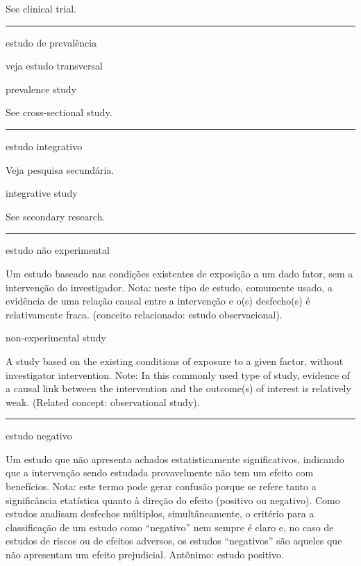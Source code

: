 \documentclass[
]{book}
\begin{document}
See clinical trial.

\begin{center}\rule{0.5\linewidth}{0.5pt}\end{center}

estudo de prevalência

veja estudo transversal

prevalence study

See cross-sectional study.

\begin{center}\rule{0.5\linewidth}{0.5pt}\end{center}

estudo integrativo

Veja pesquisa secundária.

integrative study

See secondary research.

\begin{center}\rule{0.5\linewidth}{0.5pt}\end{center}

estudo não experimental

Um estudo baseado nas condições existentes de exposição a um dado fator, sem a intervenção do investigador. Nota: neste tipo de estudo, comumente usado, a evidência de uma relação causal entre a intervenção e o(s) desfecho(s) é relativamente fraca. (conceito relacionado: estudo observacional).

non-experimental study

A study based on the existing conditions of exposure to a given factor, without investigator intervention. Note: In this commonly used type of study, evidence of a causal link between the intervention and the outcome(s) of interest is relatively weak. (Related concept: observational study).

\begin{center}\rule{0.5\linewidth}{0.5pt}\end{center}

estudo negativo

Um estudo que não apresenta achados estatisticamente significativos, indicando que a intervenção sendo estudada provavelmente não tem um efeito com benefícios. Nota: este termo pode gerar confusão porque se refere tanto a significância etatística quanto à direção do efeito (positivo ou negativo). Como estudos analisam desfechos múltiplos, simultâneamente, o critério para a classificação de um estudo como ``negativo'' nem sempre é claro e, no caso de estudos de riscos ou de efeitos adversos, os estudos ``negativos'' são aqueles que não apresentam um efeito prejudicial. Antônimo: estudo positivo.
\end{document}
